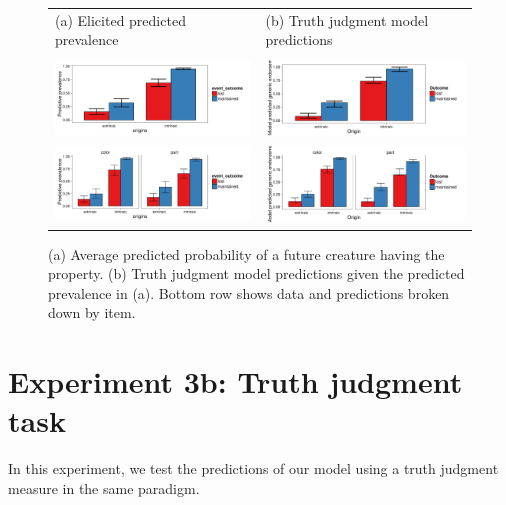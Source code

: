 \documentclass[12pt,letterpaper]{article}
\begin{document}
\begin{figure}
\begin{tabular}{l l}
(a) Elicited predicted prevalence & (b) Truth judgment model predictions\\
\\
\centering
    \includegraphics[width=0.5\columnwidth]{dobles-predictive.pdf} &
    \includegraphics[width=0.5\columnwidth]{dobles-model.pdf} \\
    \includegraphics[width=0.5\columnwidth]{dobles-predictive-byItem.pdf} &
      \includegraphics[width=0.5\columnwidth]{dobles-model-byItem.pdf} \\
\end{tabular}
    \caption{
    (a) Average predicted probability of a future creature having the property. (b) Truth judgment model predictions given the predicted prevalence in (a).
    Bottom row shows data and predictions broken down by item.
  }
  \label{fig:dobles-predictive}
\end{figure}

\section*{Experiment 3b: Truth judgment task}

In this experiment, we test the predictions of our model using a truth judgment measure in the same paradigm.
\end{document}
